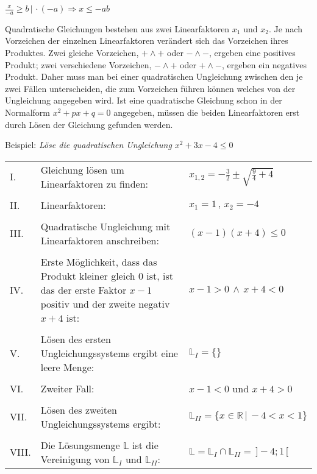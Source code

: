 $\frac{x}{-a} \geq b \,|\, \cdot (-a) \Rightarrow x \leq -ab$


Quadratische Gleichungen bestehen aus zwei Linearfaktoren $x_1$ und $x_2$. Je nach Vorzeichen der einzelnen Linearfaktoren ver\"{a}ndert sich das Vorzeichen ihres Produktes. Zwei gleiche Vorzeichen, $+ \land +$ oder $- \land -$, ergeben eine positives Produkt; zwei verschiedene Vorzeichen, $- \land +$ oder $+ \land -$, ergeben ein negatives Produkt. Daher muss man bei einer quadratischen Ungleichung zwischen den je zwei F\"{a}llen unterscheiden, die zum Vorzeichen f\"{u}hren k\"{o}nnen welches von der Ungleichung angegeben wird. Ist eine quadratische Gleichung schon in der Normalform $x^2 + px + q = 0$ angegeben, m\"{u}ssen die beiden Linearfaktoren erst durch L\"{o}sen der Gleichung gefunden werden. 

\pagebreak

Beispiel: \emph{L\"{o}se die quadratischen Ungleichung $x^2 + 3x - 4 \leq 0$}

\begin{table}[h!]
	\begin{tabular}{p{0.3cm} p{10cm} l}
		I. & Gleichung l\"{o}sen um Linearfaktoren zu finden: & $x_{1,2} = -\frac{3}{2} \pm \sqrt{\frac{9}{4} + 4}$ 
		\\ && \\
		II. & Linearfaktoren: & $x_1 = 1\,,\,x_2 = -4$
		\\ && \\
		III. & Quadratische Ungleichung mit Linearfaktoren anschreiben: & $(x - 1)(x + 4) \leq 0$
		\\ && \\
		IV. & Erste M\"{o}glichkeit, dass das Produkt kleiner gleich 0 ist, ist das der erste Faktor $x - 1$ positiv und der zweite negativ $x + 4$ ist: & $x - 1 > 0 \,\land\, x + 4 < 0$
		\\ && \\
		V. & L\"{o}sen des ersten Ungleichungssystems ergibt eine leere Menge: & $\mathbb{L}_I = \{ \}$
		\\ && \\
		VI. & Zweiter Fall: & $x - 1 < 0$ und $x + 4 > 0$
		\\ && \\
		VII. & L\"{o}sen des zweiten Ungleichungssystems ergibt: & $\mathbb{L}_{II} = \{ x \in \mathbb{R} \,|\, -4 < x < 1\}$
		\\ && \\
		VIII. & Die L\"{o}sungsmenge $\mathbb{L}$ ist die Vereinigung von $\mathbb{L}_{I}$ und $\mathbb{L}_{II}$: & $\mathbb{L} = \mathbb{L}_I \cap \mathbb{L}_{II} = \,]-4;1 \,[$
	\end{tabular}
\end{table}

